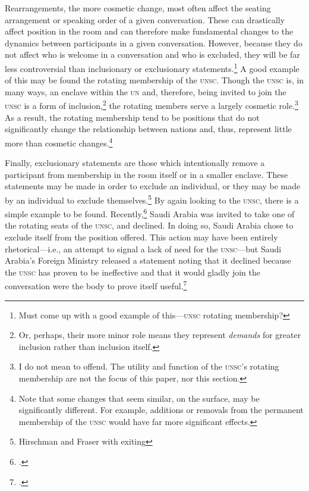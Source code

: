 \documentclass[openany,twoside]{memoir}
\begin{document}
\begin{Spacing}{2}
Rearrangements, the more cosmetic change, most often affect the seating arrangement or speaking order of a given conversation.
These can drastically affect position in the room and can therefore make fundamental changes to the dynamics between participants in a given conversation.
However, because they do not affect who is welcome in a conversation and who is excluded, they will be far less controversial than inclusionary or exclusionary statements.\footnote{
Must come up with a good example of this---\textsc{unsc} rotating membership?}
A good example of this may be found the rotating membership of the \textsc{unsc}.
Though the \textsc{unsc} is, in many ways, an enclave within the \textsc{un} and, therefore, being invited to join the \textsc{unsc} is a form of inclusion,\footnote{
Or, perhaps, their more minor role means they represent \emph{demands} for greater inclusion rather than inclusion itself.}   
the rotating members serve a largely cosmetic role.\footnote{
I do not mean to offend.
The utility and function of the \textsc{unsc}'s rotating membership are not the focus of this paper, nor this section.}
As a result, the rotating membership tend to be positions that do not significantly change the relationship between nations and, thus, represent little more than cosmetic changes.\footnote{
Note that some changes that seem similar, on the surface, may be significantly different.
For example, additions or removals from the permanent membership of the \textsc{unsc} would have far more significant effects.}

Finally, exclusionary statements are those which intentionally remove a participant from membership in the room itself or in a smaller enclave.
These statements may be made in order to exclude an individual, or they may be made by an individual to exclude themselves.\footnote{Hirschman and Fraser with exiting}
By again looking to the \textsc{unsc}, there is a simple example to be found.
Recently,\footcite{worth13} Saudi Arabia was invited to take one of the rotating seats of the \textsc{unsc}, and declined.
In doing so, Saudi Arabia chose to exclude itself from the position offered.
This action may have been entirely rhetorical---i.e., an attempt to signal a lack of need for the \textsc{unsc}---but Saudi Arabia's Foreign Ministry released a statement noting that it declined because the \textsc{unsc} has proven to be ineffective and that it would gladly join the conversation were the body to prove itself useful.\footcite{worth13}


\end{Spacing}
\end{document}

